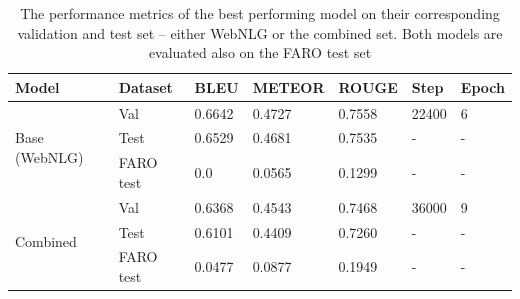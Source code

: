 \documentclass[
hf, %
]{ceurart}
\begin{document}
\begin{table}[ht]
	\caption{The performance metrics of the best performing model on their corresponding validation and test set -- either WebNLG or the combined set. Both models are evaluated also on the FARO test set}
	\centering
	\begin{tabular}{|l|l|l|l|l|l|l|}
		\hline
		\textbf{Model}                 & \textbf{Dataset} & \textbf{BLEU} & \textbf{METEOR} & \textbf{ROUGE} & \textbf{Step} & \textbf{Epoch} \\ \hline
		\multirow{3}{*}{Base (WebNLG)} & Val              & 0.6642        & 0.4727          & 0.7558         & 22400         & 6              \\ \cline{2-7}
		                               & Test             & 0.6529        & 0.4681          & 0.7535         & -             & -              \\ \cline{2-7}
		                               & FARO test        & 0.0           & 0.0565          & 0.1299         & -             & -              \\ \hline
		\multirow{3}{*}{Combined}      & Val              & 0.6368        & 0.4543          & 0.7468         & 36000         & 9              \\ \cline{2-7}
		                               & Test             & 0.6101        & 0.4409          & 0.7260         & -             & -              \\ \cline{2-7}
		                               & FARO test        & 0.0477        & 0.0877          & 0.1949         & -             & -              \\ \hline
	\end{tabular}

	\label{tab:training_jointgt}
\end{table}
\end{document}
